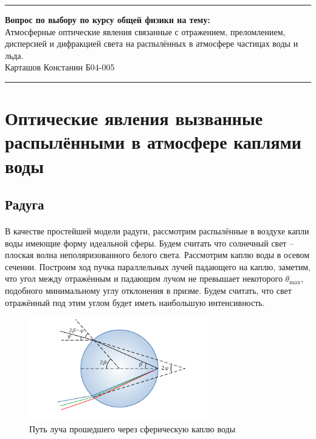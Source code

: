 \documentclass[a4paper,12pt]{article} %
\begin{document}


\hrule 	
\medskip
\begin{raggedright}
{\large \textbf{Вопрос по выбору по курсу общей физики на тему:}}
\\
\medskip
{\Large Атмосферные оптические явления связанные с отражением, преломлением, дисперсией и дифракцией света на распылённых в атмосфере частицах воды и льда.} 
\\
\medskip
{\large Карташов Констанин Б04-005}
\medskip
\hrule
\medskip
\end{raggedright}


\section{Оптические явления вызванные распылёнными в атмосфере каплями воды}

\subsection{Радуга}


\paragraph{} В качестве простейшей модели радуги, рассмотрим распылённые в воздухе капли воды имеющие форму идеальной сферы. Будем считать что солнечный свет -- плоская волна неполяризованного белого света. Рассмотрим каплю воды в осевом сечении. Построим ход пучка параллельных лучей падающего на каплю, заметим, что угол между отражённым и падающим лучом не превышает некоторого $ \theta_{\max} $, подобного минимальному углу отклонения в призме. Будем считать, что свет отражённый под этим углом будет иметь наибольшую интенсивность.

\begin{figure}[h]
\centering
\includegraphics[width=0.7\textwidth]{dropmath.pdf}
\caption{Путь луча прошедшего через сферическую каплю воды}
\label{fig:dropmath}
\end{figure}
\end{document}
